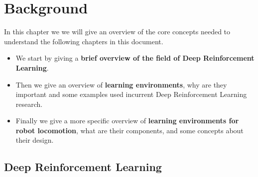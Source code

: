 \chapter{Background}
\label{ch:background}



In this chapter we we will give an overview of the core concepts needed to
understand the following chapters in this document. 


\begin{itemize}
    \item We start by giving a \textbf{brief overview of the field of Deep Reinforcement Learning}.
    \item Then we give an overview of \textbf{learning environments}, why are they 
          important and some examples used incurrent Deep Reinforcement Learning research.
    \item Finally we give a more specific overview of \textbf{learning environments 
          for robot locomotion}, what are their components, and some concepts about their design.
\end{itemize}


\section{Deep Reinforcement Learning}


